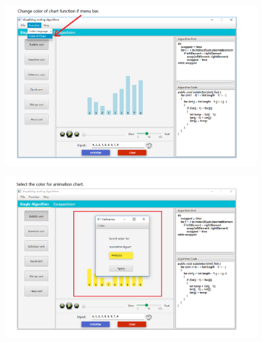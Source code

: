\documentclass[paper=a4, fontsize=11pt,twoside]{scrartcl}		%
\begin{document}
\begin{figure}[htbp]
\centering
\includegraphics[width=1\textwidth]{user_menu/14.png}
\label{user_menu14}
\end{figure}

\begin{figure}[htbp]
\centering
\includegraphics[width=1\textwidth]{user_menu/15.png}
\label{user_menu15}
\end{figure}
\end{document}
